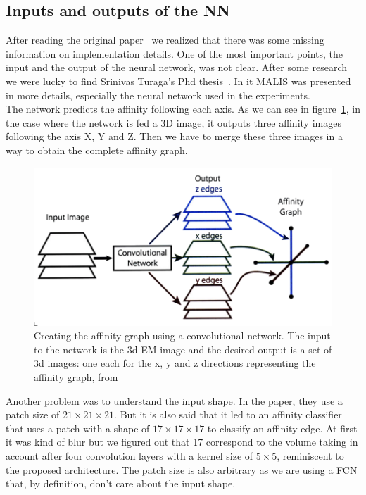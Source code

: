 \subsection{Inputs and outputs of the NN}

After reading the original paper~\cite{turaga_maximin_2009} we realized that
there was some missing information on implementation details.
One of the most important points, the input and the output of the neural
network, was not clear. After some research we were lucky to find Srinivas
Turaga's Phd thesis~\cite{turaga_learning_2010}. In it MALIS was presented in
more details, especially the neural network used in the experiments.\\

The network predicts the affinity following each axis. As we can see in
figure~\ref{fig:nn_output}, in the case where the network is fed a 3D image, it
outputs three affinity images following the axis X, Y and Z. Then we have to
merge these three images in a way to obtain the complete affinity graph.

\begin{figure}[!htbp]
	\centering
	\includegraphics[width=0.8\linewidth]{./images/nn_output.png}
	\caption{Creating the affinity graph using a convolutional network. The
	input to the network is the 3d EM image and the desired output is a set of
3d images: one each for the x, y and z directions representing the affinity
graph, from~\cite{turaga_learning_2010}}%
	\label{fig:nn_output}
\end{figure}

Another problem was to understand the input shape. In the paper, they use a
patch size of $21\times21\times21$. But it is also said that it led to an affinity
classifier that uses a patch with a shape of $17\times17\times17$ to classify an affinity
edge. At first it was kind of blur but we figured out that 17 correspond
to the volume taking in account after four convolution layers with a kernel
size of $5\times5$, reminiscent to the proposed architecture. The patch size is also arbitrary as we are using a FCN that, by definition, don’t care about the input shape.\\

